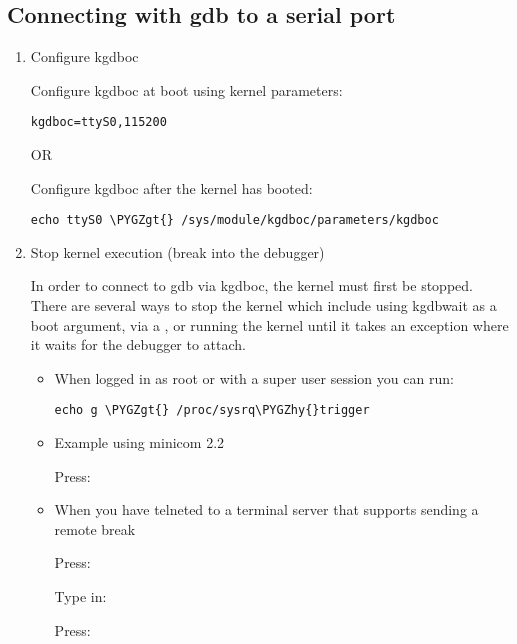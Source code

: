 \documentclass[a4paper,8pt,english]{sphinxmanual}
\def\PYGZgt{\char`\>}
\def\PYGZhy{\char`\-}
\begin{document}
\subsection{Connecting with gdb to a serial port}
\label{dev-tools/kgdb:connecting-with-gdb-to-a-serial-port}\begin{enumerate}
\item {} 
Configure kgdboc

Configure kgdboc at boot using kernel parameters:

\begin{Verbatim}[commandchars=\\\{\}]
kgdboc=ttyS0,115200
\end{Verbatim}

OR

Configure kgdboc after the kernel has booted:

\begin{Verbatim}[commandchars=\\\{\}]
echo ttyS0 \PYGZgt{} /sys/module/kgdboc/parameters/kgdboc
\end{Verbatim}

\item {} 
Stop kernel execution (break into the debugger)

In order to connect to gdb via kgdboc, the kernel must first be
stopped. There are several ways to stop the kernel which include
using kgdbwait as a boot argument, via a , or running the
kernel until it takes an exception where it waits for the debugger to
attach.
\begin{itemize}
\item {} 
When logged in as root or with a super user session you can run:

\begin{Verbatim}[commandchars=\\\{\}]
echo g \PYGZgt{} /proc/sysrq\PYGZhy{}trigger
\end{Verbatim}

\item {} 
Example using minicom 2.2

Press:   

\item {} 
When you have telneted to a terminal server that supports sending
a remote break

Press: \code{CTRL-{]}}

Type in: 

Press:  


\end{itemize}
\end{enumerate}
\end{document}

